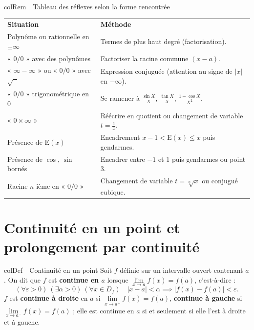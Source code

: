 \documentclass[11pt,a4paper]{article}
\newenvironment{definition}[1][Définition]
  {\begin{fiche}{colDef}{\ding{110}~~#1}}{\end{fiche}}
\newenvironment{remarque}[1][Remarque]
  {\begin{fiche}{colRem}{\ding{43}~~#1}}{\end{fiche}}
\newcommand{\E}{\mathrm{E}}
\begin{document}
\begin{remarque}[Tableau des réflexes selon la forme rencontrée]
\begin{center}
\renewcommand{\arraystretch}{1.4}
\sffamily\small
\begin{tabular}{>{\raggedright\arraybackslash}p{6.2cm} >{\raggedright\arraybackslash}p{8.6cm}}
\rowcolor{qtealdark} \color{white}\bfseries Situation & \color{white}\bfseries Méthode \\
\rowcolor{tealpale} Polynôme ou rationnelle en $\pm\infty$ & Termes de plus haut degré (factorisation). \\
« $0/0$ » avec des polynômes & Factoriser la racine commune $(x - a)$. \\
\rowcolor{tealpale} « $\infty - \infty$ » ou « $0/0$ » avec $\sqrt{\phantom{x}}$ & Expression conjuguée (attention au signe de $|x|$ en $-\infty$). \\
« $0/0$ » trigonométrique en $0$ & Se ramener à $\frac{\sin X}{X}$, $\frac{\tan X}{X}$, $\frac{1 - \cos X}{X^2}$. \\
\rowcolor{tealpale} « $0 \times \infty$ » & Réécrire en quotient ou changement de variable $t = \frac{1}{x}$. \\
Présence de $\E(x)$ & Encadrement $x - 1 < \E(x) \leq x$ puis gendarmes. \\
\rowcolor{tealpale} Présence de $\cos$, $\sin$ bornés & Encadrer entre $-1$ et $1$ puis gendarmes ou point 3. \\
Racine $n$-ième en « $0/0$ » & Changement de variable $t = \sqrt[n]{x}$ ou conjugué cubique. \\
\end{tabular}
\end{center}
\end{remarque}

\section{Continuité en un point et prolongement par continuité}

\begin{definition}[Continuité en un point]
Soit $f$ définie sur un intervalle ouvert contenant $a$. On dit que $f$ est \textbf{continue en $a$} lorsque $\lim\limits_{x \to a} f(x) = f(a)$, c'est-à-dire :
\[
  (\forall \varepsilon > 0)\ (\exists \alpha > 0)\ (\forall x \in D_f)\quad
  |x - a| < \alpha \implies |f(x) - f(a)| < \varepsilon.
\]
$f$ est \textbf{continue à droite} en $a$ si $\lim\limits_{x \to a^+} f(x) = f(a)$, \textbf{continue à gauche} si $\lim\limits_{x \to a^-} f(x) = f(a)$ ; elle est continue en $a$ si et seulement si elle l'est à droite et à gauche.
\end{definition}
\end{document}

